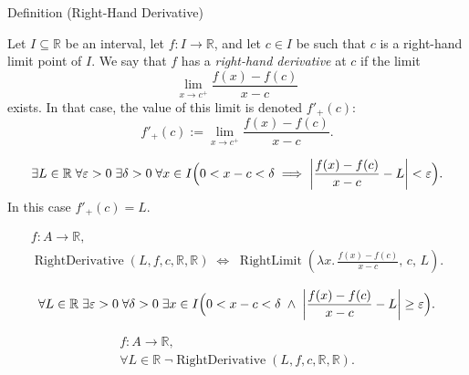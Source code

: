 \begin{definitionbox}{Definition (Right-Hand Derivative)}
\begin{definition}
\label{def:right-hand-derivative}
Let $I \subseteq \mathbb{R}$ be an interval, let $f : I \to \mathbb{R}$, and let $c \in I$ be such that $c$ is a right-hand limit point of $I$. We say that $f$ has a \emph{right-hand derivative} at $c$ if the limit
\[
\lim_{x \to c^+} \frac{f(x) - f(c)}{x - c}
\]
exists. In that case, the value of this limit is denoted $f'_+(c)$:
\[
f'_+(c) := \lim_{x \to c^+} \frac{f(x) - f(c)}{x - c}.
\]
\end{definition}
\end{definitionbox}

\begin{remark*}
\[
\exists L \in \mathbb{R}\;\forall \varepsilon > 0\;\exists \delta > 0\;\forall x \in I
\Bigl(0 < x - c < \delta \implies \left|\frac{f(x)-f(c)}{x-c} - L\right| < \varepsilon\Bigr).
\]
In this case $f'_+(c) = L$.
\end{remark*}

\begin{remark*}
\[
\begin{aligned}
  f\colon A\to\mathbb{R},\\
\operatorname{RightDerivative}(L,f,c,\mathbb{R},\mathbb{R})
\;\Longleftrightarrow\;
\operatorname{RightLimit}\!\left(\lambda x.\,\frac{f(x)-f(c)}{x-c},\, c,\, L\right).
\end{aligned}
\]
\end{remark*}

\begin{remark*}
\[
\forall L \in \mathbb{R}\;\exists \varepsilon > 0\;\forall \delta > 0\;\exists x \in I
\Bigl(0 < x - c < \delta \;\land\; \left|\frac{f(x)-f(c)}{x-c} - L\right| \ge \varepsilon\Bigr).
\]
\end{remark*}

\begin{remark*}
\[
\begin{aligned}
  f\colon A\to\mathbb{R},\\
\forall L \in \mathbb{R}\;\lnot\operatorname{RightDerivative}(L,f,c,\mathbb{R},\mathbb{R}).
\end{aligned}
\]
\end{remark*}

